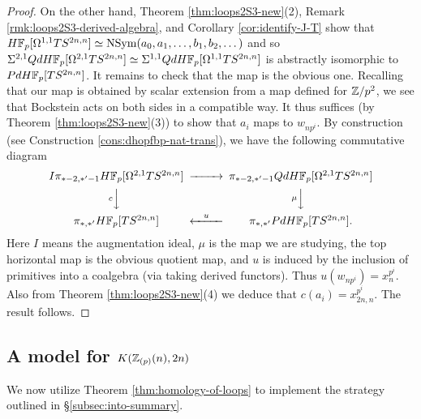 \documentclass{amsart}
\numberwithin{proposition}{section}
\numberwithin{equation}{section}
\def\NSym{\mathrm{NSym}}
\def\dHFp{dH\F_p}
\begin{document}
\begin{proof}
On the other hand, Theorem \ref{thm:loops2S3-new}(2), Remark \ref{rmk:loops2S3-derived-algebra}, and Corollary \ref{cor:identify-J-T} show that $H\F_p[\Omega^{1,1}TS^{2n,n}] \wequi \NSym(a_0, a_1, \dots, b_1,b_2, \dots)$ and so $\Sigma^{2,1}Q\dHFp[\Omega^{2,1}TS^{2n,n}] \wequi \Sigma^{1,1} Q\dHFp[\Omega^{1,1}TS^{2n,n}]$ is abstractly isomorphic to $P \dHFp[TS^{2n,n}]$.
It remains to check that the map is the obvious one.
Recalling that our map is obtained by scalar extension from a map defined for $\mathbb{Z}/p^2$, we see that Bockstein acts on both sides in a compatible way.
It thus suffices (by Theorem \ref{thm:loops2S3-new}(3)) to show that $a_i$ maps to $w_{np^i}$.
By construction (see Construction \ref{cons:dhopfbp-nat-trans}), we have the following commutative diagram
\begin{equation*}
\begin{CD}
I \pi_{*-2,*'-1} H\F_p[\Omega^{2,1}TS^{2n,n}] @>>> \pi_{*-2,*'-1} Q\dHFp[\Omega^{2,1}TS^{2n,n}] \\
@VcVV @V{\mu}VV \\
\pi_{*,*'} H\F_p[TS^{2n,n}] @<u<< \pi_{*,*'} P\dHFp[TS^{2n,n}].
\end{CD}
\end{equation*}
Here $I$ means the augmentation ideal, $\mu$ is the map we are studying, the top horizontal map is the obvious quotient map, and $u$ is induced by the inclusion of primitives into a coalgebra (via taking derived functors).
Thus $u(w_{np^i}) = x_n^{p^i}$.
Also from Theorem \ref{thm:loops2S3-new}(4) we deduce that $c(a_i) = x_{2n,n}^{p^i}$.
The result follows.
\end{proof}



\subsection{A model for $K(\mathbb{Z}_{(p)}(n), 2n)$} \label{subse:model}
We now utilize Theorem \ref{thm:homology-of-loops} to implement the strategy outlined in \S\ref{subsec:into-summary}.
\end{document}
